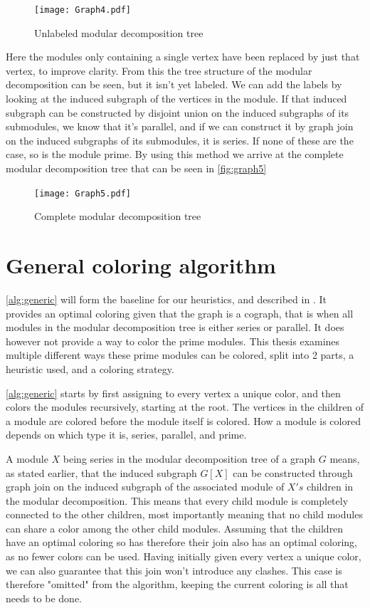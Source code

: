 \documentclass[a4paper]{article}
\begin{document}
\begin{figure}[H]
    \texttt{[image: Graph4.pdf]}
    \caption{Unlabeled modular decomposition tree}
    \label{fig:graph4}
\end{figure}

Here the modules only containing a single vertex have been replaced by just that
vertex, to improve clarity. From this the tree structure of the modular
decomposition can be seen, but it isn't yet labeled. We can add the labels by 
looking at the induced subgraph of the vertices in the module. If that induced
subgraph can be constructed by disjoint union on the induced subgraphs of its
submodules, we know that it's parallel, and if we can construct it by graph join on
the induced subgraphs of its submodules, it is series. If none of these are
the case, so is the module prime. By using this method we arrive at the complete
modular decomposition tree that can be seen in \autoref{fig:graph5}

\begin{figure}[h!]
    \texttt{[image: Graph5.pdf]}
    \caption{Complete modular decomposition tree}
    \label{fig:graph5}
\end{figure}

\FloatBarrier

\section{General coloring algorithm}

\autoref{alg:generic} will form the baseline for our heuristics, and described in
\cite{HCL}. It provides an optimal coloring given that the graph is a cograph,
that is when all modules in the modular decomposition tree is either series or
parallel.  It does however not provide a way to color the prime modules. This
thesis examines multiple different ways these prime modules can be colored, split
into 2 parts, a heuristic used, and a coloring strategy. 

\autoref{alg:generic} starts by first assigning to every vertex a unique color,
and then colors the modules recursively, starting at the root. The vertices in
the children of a module are colored before the module itself is colored. How a
module is colored depends on which type it is, series, parallel, and prime.

A module $X$ being series in the modular decomposition tree of a graph $G$
means, as stated earlier, that the induced subgraph $G[X]$ can be constructed
through graph join on the induced subgraph of the associated module of $X's$
children in the modular decomposition. This means that every child module is
completely connected to the other children, most importantly meaning that no
child modules can share a color among the other child modules. Assuming that
the children have an optimal coloring so has therefore their join also has an optimal
coloring, as no fewer colors can be used. Having initially given every vertex a
unique color, we can also guarantee that this join won't introduce any clashes.
This case is therefore "omitted" from the algorithm, keeping
the current coloring is all that needs to be done.
\end{document}
